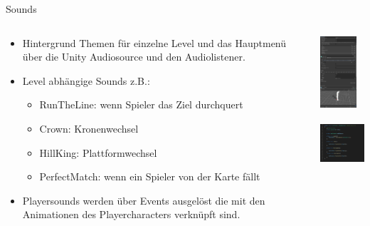 \documentclass[xcolor=dvipsnames]{beamer}
\begin{document}
\begin{frame}{Sounds}
\begin{columns}
\begin{column}{0.6\textwidth}
\begin{itemize}
		\item Hintergrund Themen für einzelne Level und das Hauptmenü über die Unity Audiosource und den Audiolistener.
		\item Level abhängige Sounds z.B.:
		\begin{itemize}
			\item RunTheLine: wenn Spieler das Ziel durchquert
			\item Crown: Kronenwechsel
			\item HillKing: Plattformwechsel
			\item PerfectMatch: wenn ein Spieler von der Karte fällt
		\end{itemize}	
		\item Playersounds werden über Events ausgelöst die mit den Animationen des Playercharacters verknüpft sind.
\end{itemize}
\end{column}
\begin{column}{0.3\textwidth} 
	\begin{center}
		\includegraphics[height=100px]{jumpsound.png}
		\\
		\includegraphics[height=90px]{playersound.png}
	\end{center}
\end{column}
\end{columns}
\end{frame}
\end{document}
